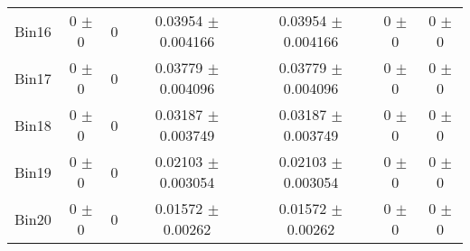 \begin{tabular}{@{\extracolsep{4pt}}lcccccc@{}}
     Bin16 & 0 $\pm$ 0 & 0 & 0.03954 $\pm$ 0.004166 & 0.03954 $\pm$ 0.004166 & 0 $\pm$ 0 & 0 $\pm$ 0 \\ 
     Bin17 & 0 $\pm$ 0 & 0 & 0.03779 $\pm$ 0.004096 & 0.03779 $\pm$ 0.004096 & 0 $\pm$ 0 & 0 $\pm$ 0 \\ 
     Bin18 & 0 $\pm$ 0 & 0 & 0.03187 $\pm$ 0.003749 & 0.03187 $\pm$ 0.003749 & 0 $\pm$ 0 & 0 $\pm$ 0 \\ 
     Bin19 & 0 $\pm$ 0 & 0 & 0.02103 $\pm$ 0.003054 & 0.02103 $\pm$ 0.003054 & 0 $\pm$ 0 & 0 $\pm$ 0 \\ 
     Bin20 & 0 $\pm$ 0 & 0 & 0.01572 $\pm$ 0.00262 & 0.01572 $\pm$ 0.00262 & 0 $\pm$ 0 & 0 $\pm$ 0 \\ 
\hline\hline
  \end{tabular}
